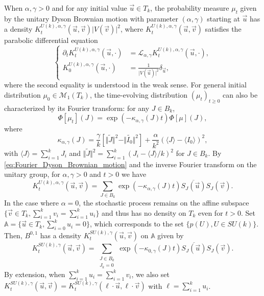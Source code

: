 \documentclass[10pt,11pt]{amsart}%
\begin{document}
When $\alpha,\gamma>0$ and for any initial value $\vec{u}\in T_{k}$, the probability measure $\mu_t$ given by the unitary Dyson Brownian motion with parameter $(\alpha,\gamma)$ starting at $\vec{u}$ has a density $K^{U(k),\alpha,\gamma}_{t}(\vec{u},\vec{v})\vert V(\vec{v})\vert^2$,  where $K^{U(k),\alpha,\gamma}_{t}(\vec{u},\vec{v})$ satisfies the parabolic differential equation 
$$\left\lbrace\begin{aligned}
\partial_tK^{U(k),\alpha,\gamma}_{t}(\vec{u},\cdot)&=\mathcal{L}_{\alpha,\gamma}K^{U(k),\alpha,\gamma}_{t}(\vec{u},\cdot),\\
K^{U(k),\alpha,\gamma}_{0}(\vec{u},\cdot)&=\frac{1}{\vert V(\vec{u})\vert^2}\delta_{\vec{u}},
\end{aligned}\right.$$
where the second equality is understood in the weak sense. For general initial distribution $\mu_0\in \mathcal{M}_1(T_k)$, the time-evolving distribution $(\mu_t)_{t\geq 0}$ can also be characterized by its Fourier transform: for any $J\in B_{k}$,
\begin{equation}\label{eq:Fourier_Dyson_Brownian_motion}
\Phi[\mu_t](J)=\exp(-\kappa_{\alpha,\gamma}(J)t)\Phi[\mu](J),
\end{equation}
where 
$$\kappa_{\alpha,\gamma}(J)=\frac{\gamma}{k}\left[\Vert \tilde{J}\Vert^2-\Vert \widetilde{I_0}\Vert^2\right]+\frac{\alpha}{k^2}(\langle J\rangle-\langle I_0\rangle)^2,$$
with $\langle J\rangle=\sum_{i=1}^k J_i$ and $\Vert \tilde{J}\Vert^2=\sum_{i=1}^k(J_i-\langle J\rangle/k)^2$ for $J\in B_{k}$. By \eqref{eq:Fourier_Dyson_Brownian_motion} and the inverse Fourier transform on the unitary group, for $\alpha,\gamma>0$ and $t>0$ we have
\begin{equation}\label{eq:series_representation_Brownian}
K^{U(k),\alpha,\gamma}_{t}(\vec{u},\vec{v})=\sum_{J\in B_{k}}\exp(-\kappa_{\alpha,\gamma}(J)t)\overline{S_{J}(\vec{u})}S_{J}(\vec{v}).
\end{equation}
In the case where $\alpha=0$, the stochastic process remains on the affine subspace $\{\vec{v}\in T_k,\sum_{i=1}
^kv_i=\sum_{i=1}^ku_i\}$ and thus has no density on $ T_{k}$ even for $t>0$. Set $\mathbb{A}=\{\vec{u}\in T_k,\sum_{i=0}^ku_i=0\}$, which corresponds to the set $\{p(U), U\in SU(k)\}$. Then, $B^{0,1}$ has a density $K^{SU(k),\gamma}_{t}(\vec{u},\vec{v})$ on $\mathbb{A}$ given by
\begin{equation}\label{eq:series_representation_Brownian_suk}
K^{SU(k),\gamma}_{t}(\vec{u},\vec{v})=\sum_{\substack{J\in B_{k}\\J_k=0}}\exp(-\kappa_{0,\gamma}(J)t)\overline{S_{J}(\vec{u})}S_{J}(\vec{v}).
\end{equation}
By extension, when $\sum_{i=1}^ku_i=\sum_{i=1}^kv_i$, we also set $K^{SU(k),\gamma}_{t}(\vec{u},\vec{v})=K^{SU(k),\gamma}_{t}(\ell\cdot\vec{u},\ell\cdot\vec{v})$ with $\ell=\sum_{i=1}^ku_i$.
\end{document}
